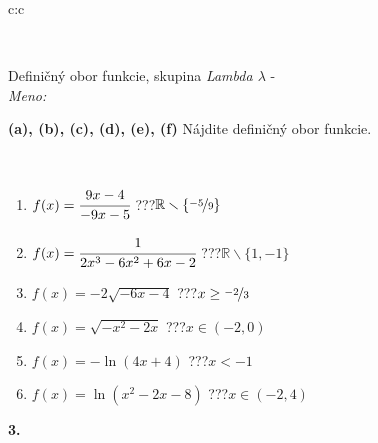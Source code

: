 \documentclass[10pt]{report}
\begin{document}
\begin{tabular}{c:c}
\begin{minipage}[c][104.5mm][t]{0.5\linewidth}
\begin{center}
\begin{minipage}{0.20\linewidth}
\begin{center}
\end{center}
\end{minipage}
\end{center}
\end{minipage}
\\ \hdashline
\begin{minipage}[c][104.5mm][t]{0.5\linewidth}
\begin{center}
\vspace{7mm}
{\huge Definičný obor funkcie, skupina \textit{Lambda $\lambda$} -}\\[5mm]
\textit{Meno:}\phantom{xxxxxxxxxxxxxxxxxxxxxxxxxxxxxxxxxxxxxxxxxxxxxxxxxxxxxxxxxxxxxxxxx}\\[5mm]
\begin{minipage}{0.95\linewidth}
\begin{center}
{
\textbf{(a), (b), (c), (d), (e), (f)} Nájdite definičný obor funkcie. \\[1mm]
\phantom{x}
}
\end{center}
\end{minipage}
\\[4mm]
\begin{minipage}{0.79\linewidth}
\begin{center}
\begin{varwidth}{\linewidth}
\begin{enumerate}
\normalsizerrr
\item $f(x)=\cfrac{9x-4}{-9x-5}$\quad \dotfill\; ???\;\dotfill \quad $ \mathbb{R} \smallsetminus\{\nicefrac{-5}{9} \}$
\item $f(x)=\cfrac{1}{2x^3-6x^2+6x-2}$\quad \dotfill\; ???\;\dotfill \quad $ \mathbb{R} \smallsetminus\{1,-1 \}$
\item $f(x)=-2\sqrt{-6x-4}$\quad \dotfill\; ???\;\dotfill \quad $x\geq\nicefrac{-2}{3}$
\item $f(x)=\sqrt{-x^2-2x}$\quad \dotfill\; ???\;\dotfill \quad $x\in(-2 , 0)$
\item $f(x)=-\ln{(4x+4)}$\quad \dotfill\; ???\;\dotfill \quad $x<-1$
\item $f(x)=\ln{(x^2-2x-8)}$\quad \dotfill\; ???\;\dotfill \quad $x\in(-2 , 4)$
\end{enumerate}
\end{varwidth}
\end{center}
\end{minipage}
\begin{minipage}{0.20\linewidth}
\begin{center}
{\Huge\bfseries 3.} \\[2mm]

\end{center}
\end{minipage}
\end{center}
\end{minipage}
\end{tabular}
\end{document}
